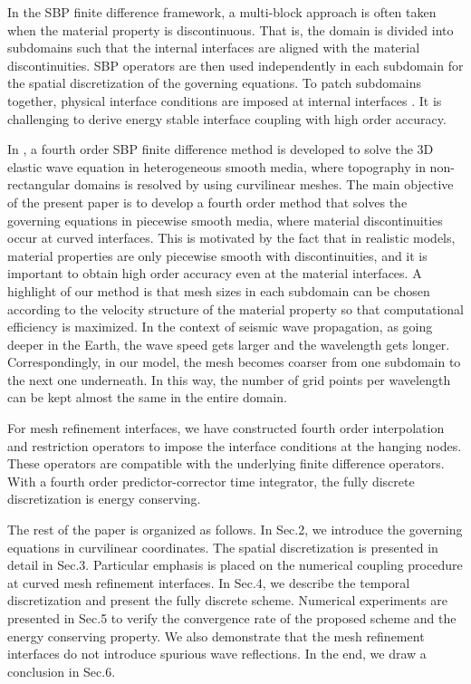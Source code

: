 In the SBP finite difference framework, a multi-block approach is often taken when the material property is discontinuous. That is, the domain is divided into subdomains such that the internal interfaces are aligned with the material discontinuities. SBP operators are then used independently in each subdomain for the spatial discretization of the governing equations. To patch subdomains together, physical interface conditions are imposed at internal interfaces \cite{Almquist2019,duru2014stable}. It is challenging to derive energy stable interface coupling with high order accuracy. 

In \cite{petersson2015wave}, a fourth order SBP finite difference method is developed to solve the 3D elastic wave equation in heterogeneous smooth media, where topography in non-rectangular domains is resolved by using curvilinear meshes. The main objective of the present paper is to develop a fourth order method that solves the governing equations in piecewise smooth media, where material discontinuities occur at curved interfaces. This is motivated by the fact that in realistic models, material properties are only piecewise smooth with discontinuities, and it is important to obtain high order accuracy even at the material interfaces. A highlight of our method is that mesh sizes in each subdomain can be chosen according to the velocity structure of the material property so that computational efficiency is maximized. In the context of seismic wave propagation, as going deeper in the Earth, the wave speed gets larger and the wavelength gets longer. Correspondingly, in our model, the mesh becomes coarser from one subdomain to the next one underneath. In this way, the number of grid points per wavelength can be kept almost the same in the entire domain. 

For mesh refinement interfaces, we have constructed fourth order interpolation and restriction operators to impose the interface conditions at the hanging nodes. These operators are compatible with the underlying finite difference operators. With a fourth order predictor-corrector time integrator, the fully discrete discretization is energy conserving. 

The rest of the paper is organized as follows. In Sec.2, we introduce the governing equations in curvilinear coordinates. The spatial discretization is presented in detail in Sec.3. Particular emphasis is placed on the numerical coupling procedure at curved mesh refinement interfaces. In Sec.4, we describe the temporal discretization and present the fully discrete scheme. Numerical experiments are presented in Sec.5 to verify the convergence rate of the proposed scheme and the energy conserving property. We also demonstrate that the mesh refinement interfaces do not introduce spurious wave reflections. In the end, we draw a conclusion in Sec.6. 
